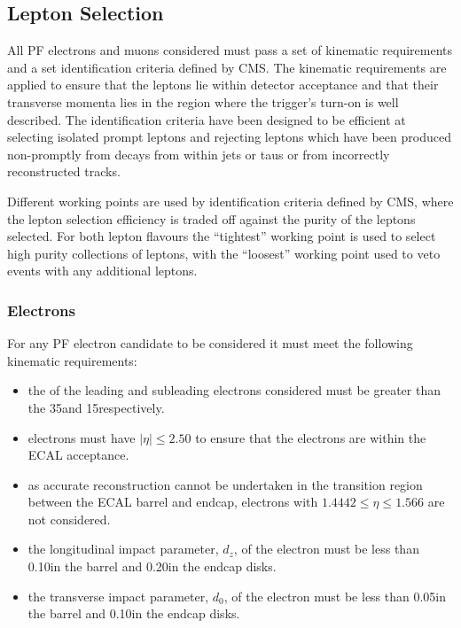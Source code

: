 \subsection{Lepton Selection}
All PF electrons and muons considered must pass a set of kinematic requirements and a set identification criteria defined by CMS.
The kinematic requirements are applied to ensure that the leptons lie within detector acceptance and that their transverse momenta lies in the region where the trigger's turn-on is well described.
The identification criteria have been designed to be efficient at selecting isolated prompt leptons and rejecting leptons which have been produced non-promptly from decays from within jets or taus or from incorrectly reconstructed tracks.

Different working points are used by identification criteria defined by CMS, where the lepton selection efficiency is traded off against the purity of the leptons selected.
For both lepton flavours the ``tightest'' working point is used to select high purity collections of leptons, with the ``loosest'' working point used to veto events with any additional leptons.

\subsubsection{Electrons}\label{subsubsec:electronSelection}
For any PF electron candidate to be considered it must meet the following kinematic requirements:

\begin{itemize}
\item the \pt of the leading and subleading electrons considered must be greater than the 35\GeVc and 15\GeVc respectively.
\item electrons must have $|\eta| \leq 2.50$ to ensure that the electrons are within the ECAL acceptance.
\item as accurate reconstruction cannot be undertaken in the transition region between the ECAL barrel and endcap, electrons with $1.4442 \leq \eta \leq 1.566$ are not considered.
\item the longitudinal impact parameter, $d_{z}$, of the electron must be less than 0.10\cm in the barrel and 0.20\cm in the endcap disks.
\item the transverse impact parameter, $d_{0}$, of the electron must be less than 0.05\cm in the barrel and 0.10\cm in the endcap disks.
\end{itemize}

